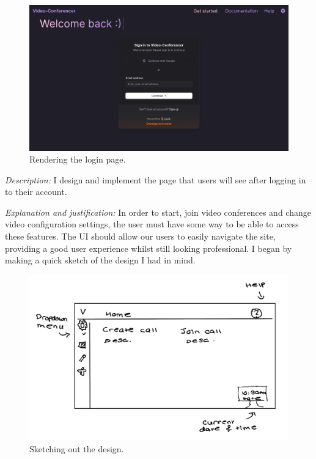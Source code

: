\begin{figure}[H]

\centering
\includegraphics[scale=0.2]{Images/Login.png}

\caption{Rendering the login page.}

\end{figure}

\textit{Description:} I design and implement the page that
users will see after logging in to their account. \\
\vspace{0.2cm}

\textit{Explanation and justification:} In order to start,
join video conferences and change video configuration
settings, the user must have some way to be able to access
these features. The UI should allow our users to easily
navigate the site, providing a good user experience whilst
still looking professional. I began by making a quick sketch
of the design I had in mind. \\

\begin{figure}[h]
\centering

\includegraphics[scale=0.2]{Images/Home_sketch.png}

\caption{Sketching out the design.}
\end{figure}

